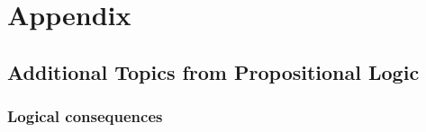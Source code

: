 \documentclass[11pt,paper=b5,footinclude,headinclude]{scrbook} %
\theoremstyle{remark}
\theoremstyle{definition} %
\theoremstyle{theorem} %
\begin{document}

\appendix
\cleardoublepage\part*{Appendix}
\chapter{Additional Topics from Propositional Logic}
\section{Logical consequences}
\end{document}
